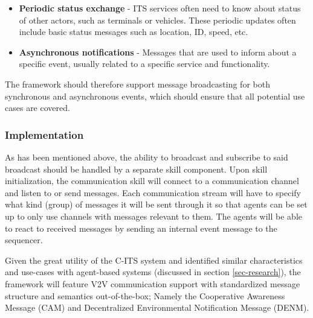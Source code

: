 \documentclass[0main.tex]{subfiles}
\begin{document}
\begin{itemize}
    \item \textbf{Periodic status exchange} - ITS services often need to know about 
    status of other actors, such as terminals or vehicles. These periodic updates 
    often include basic status messages such as location, ID, speed, etc.
    \item \textbf{Asynchronous notifications} - Messages that are used to inform 
    about a specific event, usually related to a specific service and functionality.
\end{itemize}



The framework should therefore support message broadcasting for both synchronous and 
asynchronous events, which should ensure that all potential use cases are covered. 

\subsubsection{Implementation}

As has been mentioned above, the ability to broadcast and subscribe to said broadcast should be
handled by a separate skill component. Upon skill initialization, the communication skill will
connect to a communication channel and listen to or send messages. Each communication stream will have 
to specify what kind (group) of messages it will be sent through it so that agents can be set up to 
only use channels with messages relevant to them. The agents will be able to react to received
messages by sending an internal event message to the sequencer. 

Given the great utility of the C-ITS system and identified similar characteristics and use-cases 
with agent-based systems (discussed in section \ref{sec-research}), the framework will feature 
V2V communication support with standardized message structure and semantics out-of-the-box; 
Namely the Cooperative Awareness Message (CAM) and Decentralized Environmental Notification Message (DENM).
\end{document}
